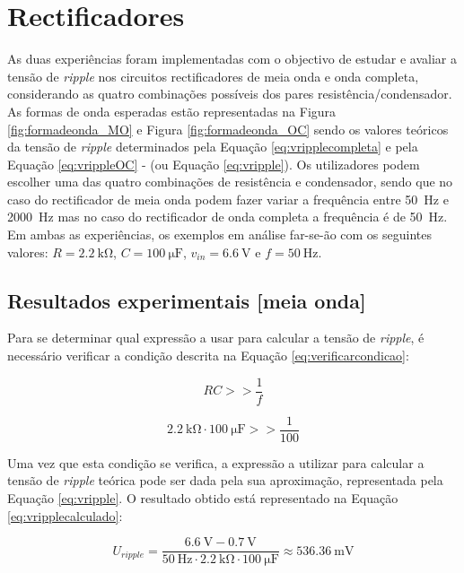 \section{Rectificadores}
\label{sec:resultados_rectificadores}
As duas experiências foram implementadas com o objectivo de estudar e avaliar a tensão de \textit{ripple} nos circuitos rectificadores de meia onda e onda completa, considerando as quatro combinações possíveis dos pares resistência/condensador. As formas de onda esperadas estão representadas na Figura \ref{fig:formadeonda_MO} e Figura \ref{fig:formadeonda_OC} sendo os valores teóricos da tensão de \textit{ripple} determinados pela Equação \ref{eq:vripplecompleta} e pela Equação \ref{eq:vrippleOC} - (ou Equação \ref{eq:vripple}). Os utilizadores podem escolher uma das quatro combinações de resistência e condensador, sendo que no caso do rectificador de meia onda podem fazer variar a frequência entre \SI{50}{\hertz} e \SI{2000}{\hertz} mas no caso do rectificador de onda completa a frequência é de \SI{50}{\hertz}. Em ambas as experiências, os exemplos em análise far-se-ão com os seguintes valores: $R=\SI{2,2}{\kilo\ohm}$, $C=\SI{100}{\micro\farad}$, $v_{in}=\SI{6,6}{\volt}$ e $f=\SI{50}{\hertz}$.

\subsection{Resultados experimentais [meia onda]}
\label{sec:resultados_RectificadoresMeiaOnda}
Para se determinar qual expressão a usar para calcular a tensão de \textit{ripple}, é necessário verificar a condição descrita na Equação \ref{eq:verificarcondicao}:

\begin{equation} \label{eq:verificarcondicao}
	RC >> \dfrac{1}{f}
\end{equation}

\begin{equation}
	\SI{2,2}{\kilo\ohm} \cdot \SI{100}{\micro\farad} >> \dfrac{1}{100}
\end{equation}

Uma vez que esta condição se verifica, a expressão a utilizar para calcular a tensão de \textit{ripple} teórica pode ser dada pela sua aproximação, representada pela Equação \ref{eq:vripple}. O resultado obtido está representado na Equação \ref{eq:vripplecalculado}:

\begin{equation} \label{eq:vripplecalculado}
	U_{ripple} = \frac{\SI{6,6}{\volt}-\SI{0,7}{\volt}}{\SI{50}{\hertz}\cdot\SI{2,2}{\kilo\ohm}\cdot\SI{100}{\micro\farad}} \approx \SI{536,36}{\milli\volt}
\end{equation}

